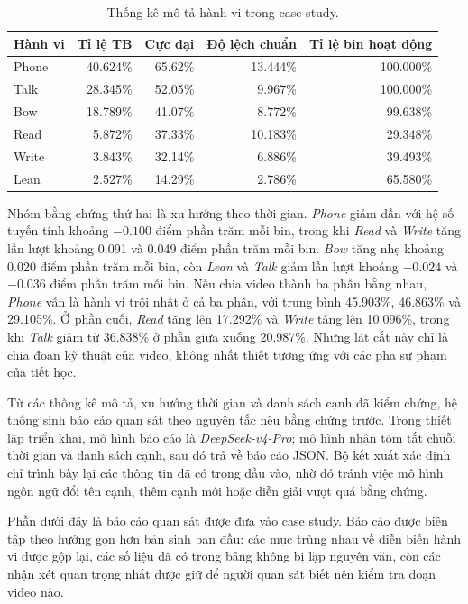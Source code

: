 \begin{table}[htbp]
\centering
\caption{Thống kê mô tả hành vi trong case study.}
\label{tab:case-study-descriptive-stats}
\begin{tabular}{lrrrr}
\toprule
\textbf{Hành vi} & \textbf{Tỉ lệ TB} & \textbf{Cực đại} & \textbf{Độ lệch chuẩn} & \textbf{Tỉ lệ bin hoạt động} \\
\midrule
Phone & 40.624\% & 65.62\% & 13.444\% & 100.000\% \\
Talk & 28.345\% & 52.05\% & 9.967\% & 100.000\% \\
Bow & 18.789\% & 41.07\% & 8.772\% & 99.638\% \\
Read & 5.872\% & 37.33\% & 10.183\% & 29.348\% \\
Write & 3.843\% & 32.14\% & 6.886\% & 39.493\% \\
Lean & 2.527\% & 14.29\% & 2.786\% & 65.580\% \\
\bottomrule
\end{tabular}
\end{table}

Nhóm bằng chứng thứ hai là xu hướng theo thời gian. \textit{Phone} giảm dần với hệ số tuyến tính khoảng \(-0.100\) điểm phần trăm mỗi bin, trong khi \textit{Read} và \textit{Write} tăng lần lượt khoảng 0.091 và 0.049 điểm phần trăm mỗi bin. \textit{Bow} tăng nhẹ khoảng 0.020 điểm phần trăm mỗi bin, còn \textit{Lean} và \textit{Talk} giảm lần lượt khoảng \(-0.024\) và \(-0.036\) điểm phần trăm mỗi bin. Nếu chia video thành ba phần bằng nhau, \textit{Phone} vẫn là hành vi trội nhất ở cả ba phần, với trung bình 45.903\%, 46.863\% và 29.105\%. Ở phần cuối, \textit{Read} tăng lên 17.292\% và \textit{Write} tăng lên 10.096\%, trong khi \textit{Talk} giảm từ 36.838\% ở phần giữa xuống 20.987\%. Những lát cắt này chỉ là chia đoạn kỹ thuật của video, không nhất thiết tương ứng với các pha sư phạm của tiết học.

Từ các thống kê mô tả, xu hướng thời gian và danh sách cạnh đã kiểm chứng, hệ thống sinh báo cáo quan sát theo nguyên tắc nêu bằng chứng trước. Trong thiết lập triển khai, mô hình báo cáo là \textit{DeepSeek-v4-Pro}; mô hình nhận tóm tắt chuỗi thời gian và danh sách cạnh, sau đó trả về báo cáo JSON. Bộ kết xuất xác định chỉ trình bày lại các thông tin đã có trong đầu vào, nhờ đó tránh việc mô hình ngôn ngữ đổi tên cạnh, thêm cạnh mới hoặc diễn giải vượt quá bằng chứng.

Phần dưới đây là báo cáo quan sát được đưa vào case study. Báo cáo được biên tập theo hướng gọn hơn bản sinh ban đầu: các mục trùng nhau về diễn biến hành vi được gộp lại, các số liệu đã có trong bảng không bị lặp nguyên văn, còn các nhận xét quan trọng nhất được giữ để người quan sát biết nên kiểm tra đoạn video nào.

